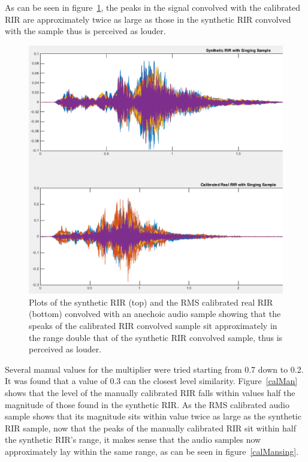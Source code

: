 \documentclass[../../main.tex]{subfiles}
\begin{document}
	As can be seen in figure~\ref{calRMSsing}, the peaks in the signal convolved with the calibrated RIR are approximately twice as large as those in the synthetic RIR convolved with the sample thus is perceived as louder.

	\begin{figure}[H]
		\begin{center}
			\includegraphics[scale = 0.3]{Sections/Implementation/RealRIRs/images/calibration/CalRMS_Sing_edit.png} 
			\caption{Plots of the synthetic \ac{RIR} (top) and the RMS calibrated real \ac{RIR} (bottom) convolved with an anechoic audio sample showing that the speaks of the calibrated \ac{RIR} convolved sample sit approximately in the range double that of the synthetic \ac{RIR} convolved sample, thus is perceived as louder.}
			\label{calRMSsing}
		\end{center}
	\end{figure}

	Several manual values for the multiplier were tried starting from 0.7 down to 0.2. It was found that a value of 0.3 can the closest level similarity. Figure~\ref{calMan} shows that the level of the manually calibrated RIR falls within values half the magnitude of those found in the synthetic RIR. As the RMS calibrated audio sample shows that its magnitude sits within value twice as large as the synthetic \ac{RIR} sample, now that the peaks of the manually calibrated \ac{RIR} sit within half the synthetic \ac{RIR}'s range, it makes sense that the audio samples now approximately lay within the same range, as can be seen in figure~\ref{calMansing}.
\end{document}

